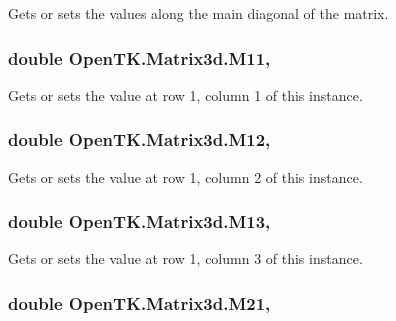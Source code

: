 Gets or sets the values along the main diagonal of the matrix. 

\hypertarget{struct_open_t_k_1_1_matrix3d_a460d6523f6ff700fcd5c6384ed0823c9}{
\subsubsection[{M11}]{\setlength{\rightskip}{0pt plus 5cm}double Open\-T\-K.\-Matrix3d.\-M11\hspace{0.3cm}{\ttfamily [get]}, {\ttfamily [set]}}}\label{struct_open_t_k_1_1_matrix3d_a460d6523f6ff700fcd5c6384ed0823c9}


Gets or sets the value at row 1, column 1 of this instance. 

\hypertarget{struct_open_t_k_1_1_matrix3d_a63895f3ea0ee35636fc2478b09db6a09}{
\subsubsection[{M12}]{\setlength{\rightskip}{0pt plus 5cm}double Open\-T\-K.\-Matrix3d.\-M12\hspace{0.3cm}{\ttfamily [get]}, {\ttfamily [set]}}}\label{struct_open_t_k_1_1_matrix3d_a63895f3ea0ee35636fc2478b09db6a09}


Gets or sets the value at row 1, column 2 of this instance. 

\hypertarget{struct_open_t_k_1_1_matrix3d_a182fe7255f28f26ad453ec0dd5b0c86f}{
\subsubsection[{M13}]{\setlength{\rightskip}{0pt plus 5cm}double Open\-T\-K.\-Matrix3d.\-M13\hspace{0.3cm}{\ttfamily [get]}, {\ttfamily [set]}}}\label{struct_open_t_k_1_1_matrix3d_a182fe7255f28f26ad453ec0dd5b0c86f}


Gets or sets the value at row 1, column 3 of this instance. 

\hypertarget{struct_open_t_k_1_1_matrix3d_a272f2d5b7203e0eb7608aeb9f3f9f5b7}{
\subsubsection[{M21}]{\setlength{\rightskip}{0pt plus 5cm}double Open\-T\-K.\-Matrix3d.\-M21\hspace{0.3cm}{\ttfamily [get]}, {\ttfamily [set]}}}\label{struct_open_t_k_1_1_matrix3d_a272f2d5b7203e0eb7608aeb9f3f9f5b7}


